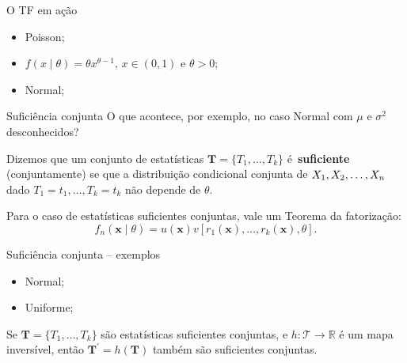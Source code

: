 \begin{frame}{O TF em ação}
\begin{itemize}
 \item Poisson;
 \item $f(x\mid\theta) = \theta x^{\theta-1}$, $x \in (0, 1)$ e $\theta > 0$;
 \item Normal;
\end{itemize} 
\end{frame}

\begin{frame}{Suficiência conjunta}
O que acontece, por exemplo, no caso Normal com $\mu$ e $\sigma^2$ desconhecidos?

 \begin{defn}
  \label{def:jointly_sufficient}
  Dizemos que  um conjunto de estatísticas $\boldsymbol{T} = \{T_1, \ldots, T_k \}$ é~\textbf{suficiente} (conjuntamente) se que a distribuição condicional conjunta de $X_1, X_2, \ldots, X_n$ dado $T_1 = t_1, \ldots, T_k = t_k$ não depende de $\theta$.  
 \end{defn}
 \begin{obs}
  Para o caso de estatísticas suficientes conjuntas, vale um Teorema da fatorização:
  \begin{equation*}
 f_n(\boldsymbol{x} \mid \theta) = u(\boldsymbol{x}) v[r_1(\boldsymbol{x}), \ldots, r_k(\boldsymbol{x}), \theta].
\end{equation*}
 \end{obs}

\end{frame}

\begin{frame}{Suficiência conjunta -- exemplos}
 \begin{itemize}
  \item Normal;
  \item Uniforme;
 \end{itemize}

  \begin{obs}
    Se $\boldsymbol{T} =  \{T_1, \ldots, T_k \}$ são estatísticas suficientes conjuntas, e $h : \mathcal{T} \to \mathbb{R}$ é um mapa inversível, então $\boldsymbol{T^\prime} = h(\boldsymbol{T})$ também são suficientes conjuntas. 
 \end{obs}
\end{frame}

